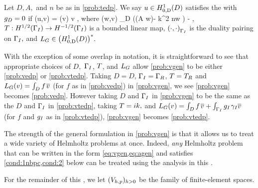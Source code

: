 \label{prob:vgen}
Let $D, A,$ and $n$ be as in \cref{prob:tedp}. We say $u \in \HozDD$ satisfies the  with $g_{D} = 0$ if
\beq\label{eq:vgen}
\aG(u,v) = \LG(v) \tfa v \in \HozDD,
\eeq
where
\beq\label{eq:agen}
\aG(w,v) \de \int_{D} \mleft(\mleft(A \grad w\mright)\cdot\grad \vbar - k^2 n\minispace w \vbar\mright) - ,
\eeq
$\T:\HhGI\rightarrow \HmhGI$ is a bounded linear map,  $\DPGI{\cdot}{\cdot}$ is the duality pairing on $\Gamma_{I},$ and $\LG  \in \HozDDs.$
\eprob

With the exception of some overlap in notation, it is straightforward to see that appropriate choices of $D,$ $\Gamma_{I}$, $T$, and $L_{G}$ allow \cref{prob:vgen} to be either \cref{prob:vedp} or \cref{prob:vtedp}. Taking $D = D$, $\Gamma_{I} = \Gamma_{R}$, $T = T_{R}$ and $L_{G}(v) = \int_{D} f\;\!\overline{v}$ (for $f$ as in \cref{prob:vedp}) in \cref{prob:vgen}, we see \cref{prob:vgen} becomes \cref{prob:vedp}. However taking $D$ and $\Gamma_{I}$ in \cref{prob:vgen} to be the same as the $D$ and $\Gamma_{I}$ in \cref{prob:vtedp}, taking $T=ik,$ and $L_{G}(v) = \int_{D} f\;\!\overline{v} + \int_{\Gamma_{I}} g_{I} \;\!\gamma_{I} \overline{v}$ (for $f$ and $g_{I}$ as in \cref{prob:vtedp}), \cref{prob:vgen} becomes \cref{prob:vtedp}.
\ere

The strength of the general formulation in \cref{prob:vgen} is that it allows us to treat a wide variety of Helmholtz problems at once. Indeed, \emph{any} Helmholtz problem that can be written in the form \cref{eq:vgen,eq:agen} and satisfies \cref{cond:1nbpc,cond:2} below can be treated using the analysis in this .
\ere 

For the remainder of this , we let $(V_{h,p})_{h>0}$ be the family of finite-element spaces.

